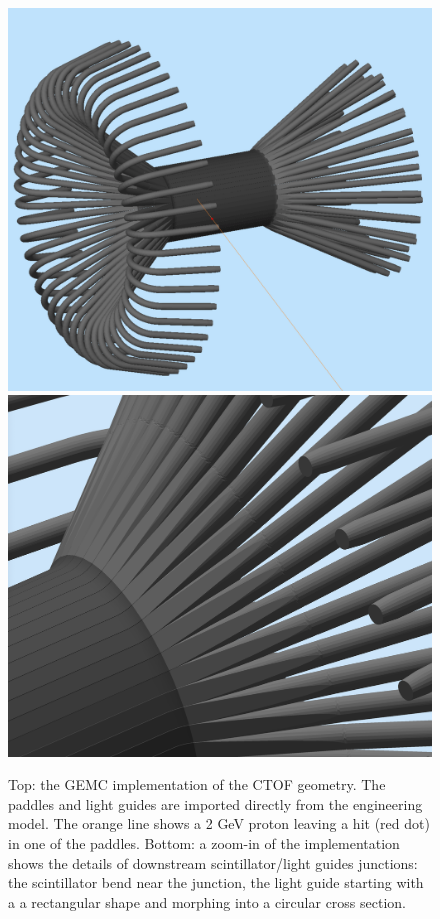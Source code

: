 \begin{figure}
	\centering
	\includegraphics[width=0.99\columnwidth,keepaspectratio]{img/ctofGeometry.png}
	\includegraphics[width=0.99\columnwidth,keepaspectratio]{img/ctofDetail.png}
	\caption{Top: the GEMC implementation of the CTOF geometry. The paddles and light guides are imported directly from the engineering model.
			   The orange line shows a 2 GeV proton leaving a hit (red dot) in one of the paddles.
				Bottom: a zoom-in of the implementation shows the details of downstream scintillator/light guides junctions: the scintillator bend near the junction, the light guide starting
				with a a rectangular shape and morphing into a circular cross section.}
	\label{fig:ctofGeometry}
\end{figure}


